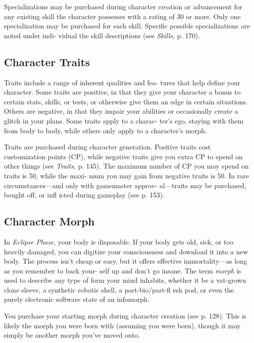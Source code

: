 Specializations may be purchased during character 
creation or advancement for any existing skill the 
character possesses with a rating of 30 or more. Only 
one specialization may be purchased for each skill. 
Specific possible specializations are noted under indi-
vidual the skill descriptions (see \textit{Skills,} p. 170).

\subsection{Character Traits}

Traits include a range of inherent qualities and fea-
tures that help define your character. Some traits are 
positive, in that they give your character a bonus to 
certain stats, skills, or tests, or otherwise give them 
an edge in certain situations. Others are negative, in 
that they impair your abilities or occasionally create 
a glitch in your plans. Some traits apply to a charac-
ter's ego, staying with them from body to body, while 
others only apply to a character's morph. 

Traits are purchased during character generation. 
Positive traits cost customization points (CP), while 
negative traits give you extra CP to spend on other 
things (see \textit{Traits,} p. 145). The maximum number of 
CP you may spend on traits is 50, while the maxi-
mum you may gain from negative traits is 50. In rare 
circumstances—and only with gamemaster approv-
al—traits may be purchased, bought off, or infl icted 
during gameplay (see p. 153).

\subsection{Character Morph}

In \textit{Eclipse Phase,} your body is disposable. If your body 
gets old, sick, or too heavily damaged, you can digitize 
your consciousness and download it into a new body. 
The process isn't cheap or easy, but it offers effective 
immortality—as long as you remember to back your-
self up and don't go insane. The term \textit{morph }is used to 
describe any type of form your mind inhabits, whether 
it be a vat-grown clone sleeve, a synthetic robotic shell, 
a part-bio/part-fl esh pod, or even the purely electronic 
software state of an infomorph.

You purchase your starting morph during character 
creation (see p. 128). This is likely the morph you 
were born with (assuming you were born), though it 
may simply be another morph you've moved onto.


